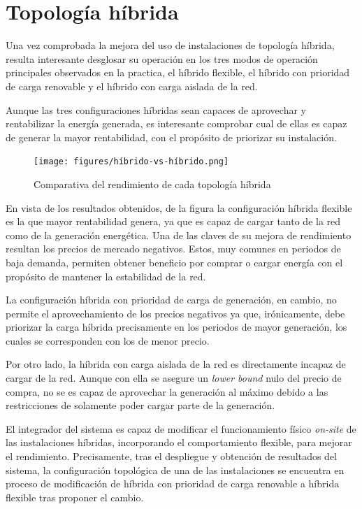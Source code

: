 \section{Topología híbrida}
\label{makereference7.4}

Una vez comprobada la mejora del uso de instalaciones de topología híbrida, resulta interesante desglosar su operación en los tres modos de operación principales observados en la practica, el híbrido flexible, el híbrido con prioridad de carga renovable y el híbrido con carga aislada de la red.

Aunque las tres configuraciones híbridas sean capaces de aprovechar y rentabilizar la energía generada, es interesante comprobar cual de ellas es capaz de generar la mayor rentabilidad, con el propósito de priorizar su instalación.

\begin{figure}
  \centering
  \texttt{[image: figures/híbrido-vs-híbrido.png]}
  \caption{Comparativa del rendimiento de cada topología híbrida}
  \label{fig:híbrido-vs-híbrido}
\end{figure}

En vista de los resultados obtenidos, de la figura  la configuración híbrida flexible es la que mayor rentabilidad genera, ya que es capaz de cargar tanto de la red como de la generación energética. Una de las claves de su mejora de rendimiento resultan los precios de mercado negativos. Estos, muy comunes en periodos de baja demanda, permiten obtener beneficio por comprar o cargar energía con el propósito de mantener la estabilidad de la red.

La configuración híbrida con prioridad de carga de generación, en cambio, no permite el aprovechamiento de los precios negativos ya que, irónicamente, debe priorizar la carga híbrida precisamente en los periodos de mayor generación, los cuales se corresponden con los de menor precio.

Por otro lado, la híbrida con carga aislada de la red es directamente incapaz de cargar de la red. Aunque con ella se asegure un \textit{lower bound} nulo del precio de compra, no se es capaz de aprovechar la generación al máximo debido a las restricciones de solamente poder cargar parte de la generación.

El integrador del sistema es capaz de modificar el funcionamiento físico \textit{on-site} de las instalaciones híbridas, incorporando el comportamiento flexible, para mejorar el rendimiento. Precisamente, tras el despliegue y obtención de resultados del sistema, la configuración topológica de una de las instalaciones se encuentra en proceso de modificación de híbrida con prioridad de carga renovable a híbrida flexible tras proponer el cambio.

